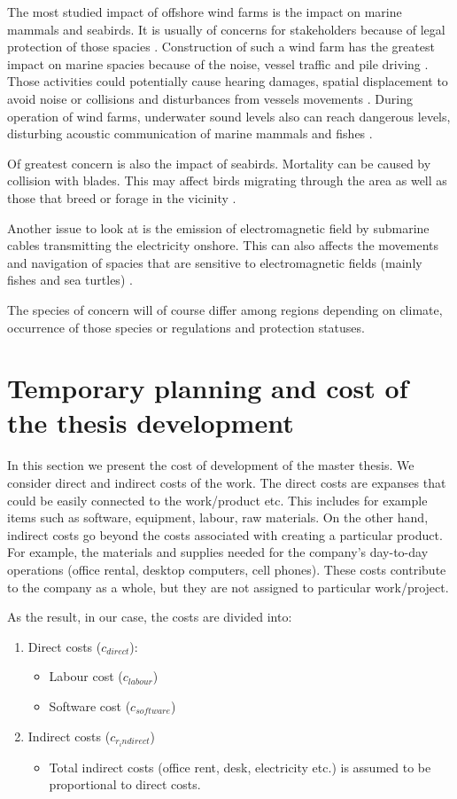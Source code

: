 \documentclass[12pt]{report} %
\begin{document}
The most studied impact of offshore wind farms is the impact on marine mammals and seabirds. It is usually of concerns for stakeholders because of legal protection of those spacies \cite{bailey2014}. Construction of such a wind farm has the greatest impact on marine spacies because of the noise, vessel traffic and pile driving \cite{dolman2010}. Those activities could potentially cause hearing damages, spatial displacement to avoid noise or collisions and disturbances from vessels movements \cite{madsen2006}.  During operation of wind farms, underwater sound levels also can reach dangerous levels, disturbing acoustic communication of marine mammals \cite{tougaard2009} and fishes \cite{wahlberg2005}. 

Of greatest concern is also the impact of seabirds. Mortality can be caused by collision with blades. This may affect birds migrating through the area as well as those that breed or forage in the vicinity \cite{desholm2005}.

Another issue to look at is the emission of electromagnetic field by submarine cables transmitting the electricity onshore. This can also affects the movements and navigation of spacies that are sensitive to  electromagnetic fields (mainly fishes and sea turtles) \cite{tricas2011}.

The species of concern will of course differ among regions depending on climate, occurrence of those species or regulations and protection statuses.

\chapter{Temporary planning and cost of the thesis development}
In this section we present the cost of development of the master thesis. We consider direct and indirect costs of the work. The direct costs are expanses that could be easily connected to the work/product etc. This includes for example items such as software, equipment, labour, raw materials. On the other hand, indirect costs go beyond the costs associated with creating a particular product. For example, the materials and supplies needed for the company's day-to-day operations (office rental, desktop computers, cell phones). These costs contribute to the company as a whole, but they are not assigned to particular work/project.

As the result, in our case, the costs are divided into:
\begin{enumerate}
	\item Direct costs ($c_{direct}$):
	\begin{itemize}
		\item Labour cost ($c_{labour}$)
		\item Software cost ($c_{software}$)
	\end{itemize}
	\item Indirect costs ($c_{r_indirect}$)
	\begin{itemize}
		\item Total indirect costs (office rent, desk, electricity etc.) is assumed to be proportional to direct costs.
	\end{itemize}
\end{enumerate}
\end{document}
